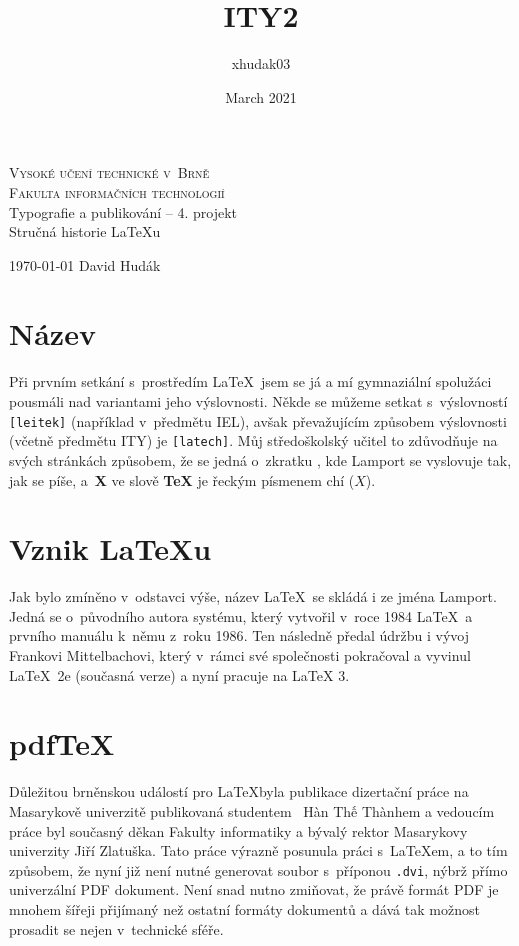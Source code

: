\documentclass[11pt, a4paper]{article}
\title{ITY2}
\author{xhudak03}
\date{March 2021}
\begin{document}
\begin{titlepage}
\begin{center}
{\Huge
\textsc{Vysoké učení technické v~Brně\huge{\\[0.4em]Fakulta informačních technologií}}}\\
\LARGE
Typografie a publikování -- 4. projekt\\[0.3em]\huge Stručná historie \LaTeX u
\end{center}
{\LARGE \today \hfill
David Hudák}
\thispagestyle{empty}
\end{titlepage}

\clearpage
{} 
\newpage


\section{Název}
\begin{sloppypar}
Při prvním setkání s~prostředím \LaTeX~jsem se já a mí gymnaziální spolužáci
pousmáli nad variantami jeho výslovnosti. Někde se můžeme setkat
s~výslovností \verb|[leitek]| (například v~předmětu IEL), 
avšak převažujícím způsobem výslovnosti (včetně předmětu ITY) je
\verb|[latech]|. Můj středoškolský učitel to zdůvodňuje na svých stránkách\cite{martinek1} způsobem, že se jedná o~zkratku , kde Lamport se vyslovuje tak, jak se píše, a~\textbf{X} ve slově \textbf{TeX} je řeckým písmenem chí ($X$).
\end{sloppypar}
\section{Vznik \LaTeX u}
Jak bylo zmíněno v~odstavci výše, název \LaTeX~se skládá i ze jména Lamport.
Jedná se o~původního autora systému, který vytvořil v~roce 1984 \LaTeX~a
prvního manuálu k~němu z~roku 1986\cite{prvnimanual}. Ten následně předal
údržbu i vývoj Frankovi Mittelbachovi, který v~rámci své společnosti
pokračoval a vyvinul \LaTeX~2e (současná verze) a nyní pracuje na \LaTeX  
3\cite{lamport}.

\section{pdfTeX}
\label{pdf}
Důležitou brněnskou událostí pro \LaTeX byla publikace dizertační práce 
na Masarykově univerzitě publikovaná studentem ~Hàn Thế Thànhem\cite{pdflatex} a vedoucím práce byl současný děkan Fakulty informatiky a bývalý rektor Masarykovy univerzity Jiří Zlatuška\cite{zlatuska}. Tato práce výrazně posunula práci s~\LaTeX em, a to tím způsobem, že nyní již není nutné generovat soubor s~příponou \verb|.dvi|, nýbrž přímo univerzální PDF dokument. Není snad nutno zmiňovat, že právě formát PDF je mnohem šířeji přijímaný než ostatní formáty dokumentů a dává tak možnost prosadit se nejen v~technické sféře.
\end{document}
